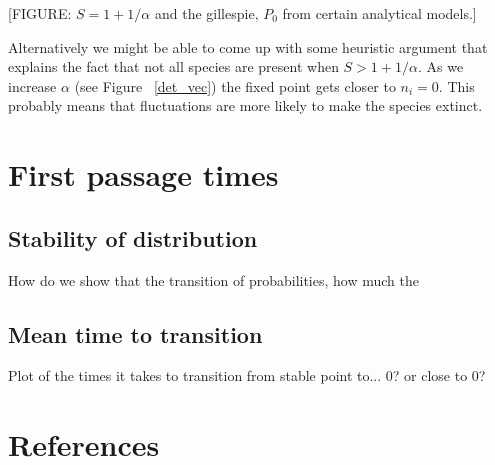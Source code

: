 \documentclass[11pt,a4paper,final]{iopart}
\begin{document}
[FIGURE: $S=1+1/\alpha$ and the gillespie, $P_0$ from certain analytical models.]

Alternatively we might be able to come up with some heuristic argument that explains the fact that not all species are present when $S>1+1/\alpha$.
As we increase $\alpha$ (see Figure ~\ref{det_vec}) the fixed point gets closer to $n_i=0$. This probably means that fluctuations are more likely to make the species extinct.

\section{First passage times}


\subsection{Stability of distribution}

How do we show that the transition of probabilities, how much the 

\subsection{Mean time to transition}

Plot of the times it takes to transition from stable point to... 0? or close to 0?

\section*{References}
{}


\newpage
{} %
\renewcommand{\theequation}{\thesection.\arabic{equation}} 
\end{document}

